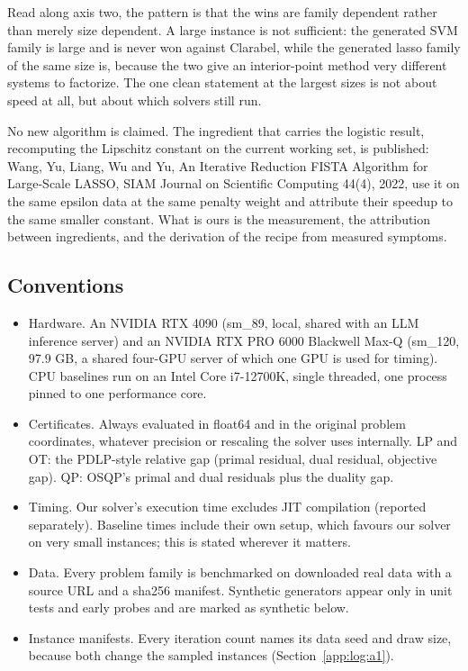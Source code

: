 Read along axis two, the pattern is that the wins are family dependent rather
than merely size dependent. A large instance is not sufficient: the generated
SVM family is large and is never won against Clarabel, while the generated
lasso family of the same size is, because the two give an interior-point
method very different systems to factorize. The one clean statement at the
largest sizes is not about speed at all, but about which solvers still run.

No new algorithm is claimed. The ingredient that carries the logistic result,
recomputing the Lipschitz constant on the current working set, is published:
Wang, Yu, Liang, Wu and Yu, An Iterative Reduction FISTA Algorithm for
Large-Scale LASSO, SIAM Journal on Scientific Computing 44(4), 2022, use it on
the same epsilon data at the same penalty weight and attribute their speedup
to the same smaller constant. What is ours is the measurement, the attribution
between ingredients, and the derivation of the recipe from measured symptoms.

\subsection{Conventions}
\label{app:log:conventions}

\begin{itemize}
\item Hardware. An NVIDIA RTX 4090 (sm\_89, local, shared with an LLM
 inference server) and an NVIDIA RTX PRO 6000 Blackwell Max-Q (sm\_120,
 97.9 GB, a shared four-GPU server of which one GPU is used for timing).
 CPU baselines run on an Intel Core i7-12700K, single threaded, one process
 pinned to one performance core.
\item Certificates. Always evaluated in float64 and in the original problem
 coordinates, whatever precision or rescaling the solver uses internally.
 LP and OT: the PDLP-style relative gap (primal residual, dual residual,
 objective gap). QP: OSQP's primal and dual residuals plus the duality gap.
\item Timing. Our solver's execution time excludes JIT compilation (reported
 separately). Baseline times include their own setup, which favours our
 solver on very small instances; this is stated wherever it matters.
\item Data. Every problem family is benchmarked on downloaded real data with
 a source URL and a sha256 manifest. Synthetic generators appear only in
 unit tests and early probes and are marked as synthetic below.
\item Instance manifests. Every iteration count names its data seed and draw
 size, because both change the sampled instances (Section~\ref{app:log:a1}).
\end{itemize}

